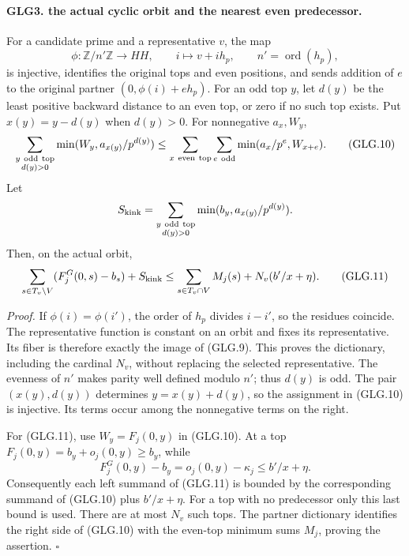 \paragraph{GLG3. the actual cyclic orbit and the nearest even predecessor.}
\label{claim:GLG3}
For a candidate prime and a representative \(v\), the map
\[
 \phi:\mathbb Z/n'\mathbb Z\longrightarrow HH,\qquad
       i\longmapsto v+i h_p,\qquad n'=\operatorname{ord}(h_p),
                                                                    \tag{GLG.9}
\]
is injective, identifies the original tops and even positions,
and sends addition of \(e\) to the original partner
\((0,\phi(i)+e h_p)\). For an odd top \(y\), let \(d(y)\) be
the least positive backward distance to an even top, or zero
if no such top exists. Put \(x(y)=y-d(y)\) when \(d(y)>0\).
For nonnegative \(a_x,W_y\),
\[
 \sum_{\substack{y\ {\rm odd\ top}\\d(y)>0}}
          \min(W_y,a_{x(y)}/p^{d(y)})
 \le\sum_{x\ {\rm even\ top}}\sum_{e\ {\rm odd}}
          \min(a_x/p^e,W_{x+e}).                                  \tag{GLG.10}
\]
Let
\[
 S_{\rm kink}=\sum_{\substack{y\ {\rm odd\ top}\\d(y)>0}}
                      \min(b_y,a_{x(y)}/p^{d(y)}).
 \]
Then, on the actual orbit,
\[
 \sum_{s\in T_v\setminus V}(F_j^G(0,s)-b_s)+S_{\rm kink}
       \le\sum_{s\in T_v\cap V}M_j(s)+N_v(b'/x+\eta).              \tag{GLG.11}
\]

\emph{Proof.}
If \(\phi(i)=\phi(i')\), the order of \(h_p\) divides \(i-i'\),
so the residues coincide. The representative function is constant
on an orbit and fixes its representative. Its fiber is therefore
exactly the image of (GLG.9). This proves the dictionary, including
the cardinal \(N_v\), without replacing the selected representative.
The evenness of \(n'\) makes parity well defined modulo \(n'\);
thus \(d(y)\) is odd. The pair \((x(y),d(y))\) determines
\(y=x(y)+d(y)\), so the assignment in (GLG.10) is injective.
Its terms occur among the nonnegative terms on the right.

For (GLG.11), use \(W_y=F_j(0,y)\) in (GLG.10).
At a top \(F_j(0,y)=b_y+o_j(0,y)\ge b_y\), while
\[
 F_j^G(0,y)-b_y=o_j(0,y)-\kappa_j\le b'/x+\eta.
 \]
Consequently each left summand of (GLG.11) is bounded by
the corresponding summand of (GLG.10) plus \(b'/x+\eta\).
For a top with no predecessor only this last bound is used.
There are at most \(N_v\) such tops. The partner dictionary
identifies the right side of (GLG.10) with the even-top
minimum sums \(M_j\), proving the assertion.
\hfill\(\square\)

